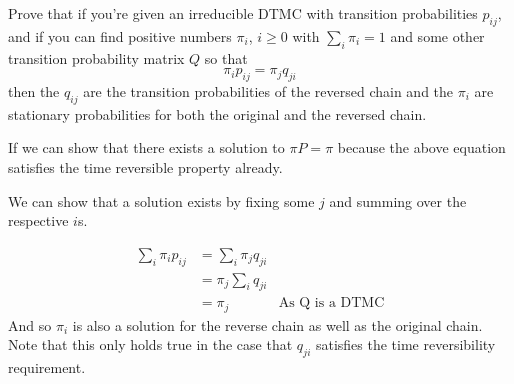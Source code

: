 \documentclass[10pt,a4paper]{exam}
\begin{document}
\begin{questions}
\pagebreak













\question Prove that if you're given an irreducible DTMC with transition probabilities $p_{ij}$, and if you can find positive numbers $\pi_i$, $i \geq 0$ with $\sum_i \pi_i = 1$ and some other transition probability matrix $Q$ so that
$$\pi_i p_{ij} = \pi_j q_{ji}$$
then the $q_{ij}$ are the transition probabilities of the reversed chain and the $\pi_i$ are stationary probabilities for both the original and the reversed chain.

\begin{solution}
If we can show that there exists a solution to $\pi P = \pi$ because the above equation satisfies the time reversible property already. 

We can show that a solution exists by fixing some $j$ and summing over the respective $i$s.

\begin{align*}
\sum_i \pi_i p_{ij} &= \sum_i \pi_jq_{ji}\\
							&= \pi_j \sum_i q_{ji}\\
							&= \pi_j & \text{As Q is a DTMC}
\end{align*}
And so $\pi_i$ is also a solution for the reverse chain as well as the original chain. Note that this only holds true in the case that $q_{ji}$ satisfies the time reversibility requirement.
\end{solution}

















\end{questions}
\end{document}
